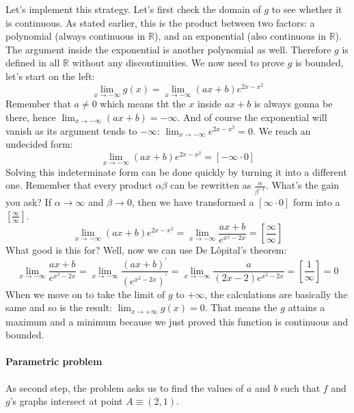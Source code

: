 Let's implement this strategy. Let's first check the domain of $g$
to see whether it is continuous. As stated earlier, this is the product
between two factors: a polynomial (always continuous in $\mathbb{R}$),
and an exponential (also continuous in $\mathbb{R}$). The argument
inside the exponential is another polynomial as well. Therefore
$g$ is defined in all $\mathbb{R}$ without any discontinuities.
We now need to prove $g$ is bounded, let's start on the left:
\begin{equation*}
    \lim_{x \to -\infty} g(x) = \lim_{x \to -\infty} (ax + b)e^{2x - x^2}
\end{equation*}
Remember that $a \neq 0$ which means tht the $x$ inside $ax + b$ is
always gonna be there, hence $\lim_{x \to -\infty} (ax + b) = -\infty$.
And of course the exponential will vanish as its argument tends
to $-\infty$: $\lim_{x \to -\infty} e^{2x - x^2} = 0$. We reach
an undecided form:
\begin{equation*}
    \lim_{x \to -\infty} (ax + b)e^{2x - x^2} =
        [-\infty \cdot 0]
\end{equation*}
Solving this indeterminate form can be done quickly by turning it into
a different one. Remember that every product $\alpha \beta$ can be
rewritten as $\frac{\alpha}{\beta^{-1}}$. What's the gain you ask?
If $\alpha \to \infty$ and $\beta \to 0$, then we have transformed a
$[\infty \cdot 0]$ form into a $[\frac{\infty}{\infty}]$.
\begin{equation*}
    \lim_{x \to -\infty} (ax + b)e^{2x - x^2} =
    \lim_{x \to -\infty} \frac{ax + b}{e^{x^2 - 2x}} =
    \left[\frac{\infty}{\infty}\right]
\end{equation*}
What good is this for? Well, now we can use De L\^{o}pital's
theorem:
\begin{equation*}
    \lim_{x \to -\infty} \frac{ax + b}{e^{x^2 - 2x}} =
    \lim_{x \to -\infty} \frac{(ax + b)^\prime}{\left( e^{x^2 - 2x} \right)^\prime} =
    \lim_{x \to -\infty} \frac{a}{(2x - 2)e^{x^2 - 2x}} =
    \left[\frac{1}{\infty}\right] = 0
\end{equation*}
When we move on to take the limit of $g$ to $+\infty$,
the calculations are basically
the same and so is the result: $\lim_{x \to +\infty} g(x) = 0$.
That means the $g$ attains a maximum and a minimum because we just proved this
function is continuous and bounded.

\paragraph[Problem 2]{Parametric problem}
\label{par:subp2_1}
As second step, the problem asks us to find the values of $a$ and $b$ such that
$f$ and $g$'s graphs intersect at point $A \equiv (2,1)$.

